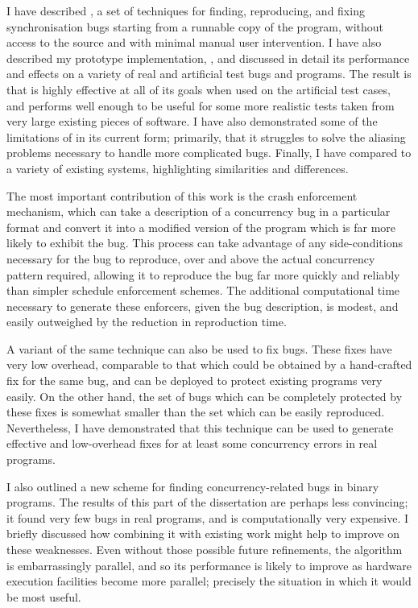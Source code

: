 I have described {\technique}, a set of techniques for finding,
reproducing, and fixing synchronisation bugs starting from a runnable
copy of the program, without access to the source and with minimal
manual user intervention.  I have also described my prototype
implementation, {\implementation}, and discussed in detail its
performance and effects on a variety of real and artificial test bugs
and programs.  The result is that {\technique} is highly effective at
all of its goals when used on the artificial test cases, and performs
well enough to be useful for some more realistic tests taken from very
large existing pieces of software.  I have also demonstrated some of
the limitations of {\technique} in its current form; primarily, that
it struggles to solve the aliasing problems necessary to handle more
complicated bugs.  Finally, I have compared {\technique} to a variety
of existing systems, highlighting similarities and differences.

The most important contribution of this work is the crash enforcement
mechanism, which can take a description of a concurrency bug in a
particular format and convert it into a modified version of the
program which is far more likely to exhibit the bug.  This process can
take advantage of any side-conditions necessary for the bug to
reproduce, over and above the actual concurrency pattern required,
allowing it to reproduce the bug far more quickly and reliably than
simpler schedule enforcement schemes.  The additional computational
time necessary to generate these enforcers, given the bug description,
is modest, and easily outweighed by the reduction in reproduction
time.

A variant of the same technique can also be used to fix bugs.  These
fixes have very low overhead, comparable to that which could be
obtained by a hand-crafted fix for the same bug, and can be deployed
to protect existing programs very easily.  On the other hand, the set
of bugs which can be completely protected by these fixes is somewhat
smaller than the set which can be easily reproduced.  Nevertheless, I
have demonstrated that this technique can be used to generate
effective and low-overhead fixes for at least some concurrency errors
in real programs.

I also outlined a new scheme for finding concurrency-related bugs in
binary programs.  The results of this part of the dissertation are
perhaps less convincing; it found very few bugs in real programs, and
is computationally very expensive.  I briefly discussed how combining
it with existing work might help to improve on these weaknesses.  Even
without those possible future refinements, the algorithm is
embarrassingly parallel, and so its performance is likely to improve
as hardware execution facilities become more parallel; precisely the
situation in which it would be most useful.

